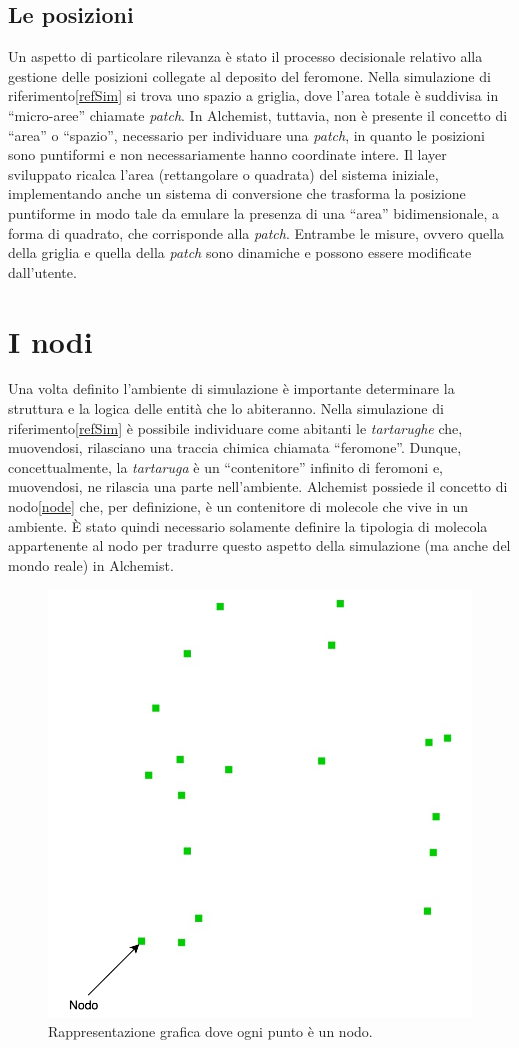 \subsection{Le posizioni}
Un aspetto di particolare rilevanza è stato il processo decisionale relativo alla gestione delle posizioni collegate 
al deposito del feromone. Nella simulazione di riferimento\space\ref{refSim} si trova uno spazio a griglia, dove l'area totale è suddivisa
in ``micro-aree'' chiamate \textit{patch}. In Alchemist, tuttavia, non è presente il concetto di ``area'' o ``spazio'', necessario per individuare una \textit{patch},
in quanto le posizioni sono puntiformi e non necessariamente hanno coordinate intere. Il layer sviluppato ricalca l'area (rettangolare o quadrata) del sistema iniziale,
implementando anche un sistema di conversione che trasforma la posizione puntiforme in modo tale da emulare la presenza di una ``area'' bidimensionale, a forma di quadrato, che corrisponde alla \textit{patch}.
Entrambe le misure, ovvero quella della griglia e quella della \textit{patch} sono dinamiche e possono essere modificate dall'utente.
\section{I nodi}
Una volta definito l'ambiente di simulazione è importante determinare la struttura e la logica delle 
entità che lo abiteranno. Nella simulazione di riferimento\space\ref{refSim} è possibile individuare come abitanti le \textit{tartarughe}
che, muovendosi, rilasciano una traccia chimica chiamata ``feromone''. Dunque, concettualmente, la \textit{tartaruga} è un ``contenitore'' infinito di 
feromoni e, muovendosi, ne rilascia una parte nell'ambiente. Alchemist possiede il concetto di nodo\space\ref{node} che, per definizione, 
è un contenitore di molecole che vive in un ambiente. È stato quindi necessario solamente definire la tipologia di molecola
appartenente al nodo per tradurre questo aspetto della simulazione (ma anche del mondo reale) in Alchemist.

\begin{figure}[ht]
    \centering
    \includegraphics[width=.5\linewidth]{figures/nodes.png}
    \caption{Rappresentazione grafica dove ogni punto è un nodo.}\label{fig:nodes}
\end{figure}

